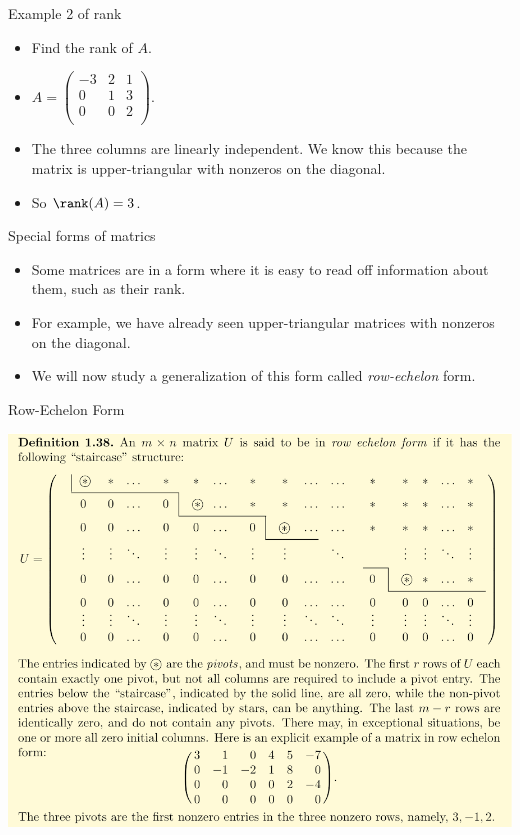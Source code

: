 \documentclass{beamer}
\begin{document}
\begin{frame}{Example 2 of rank}

\begin{itemize}
\item Find the rank of $A$.
\item $A=
\begin{pmatrix}
-3  & 2  & 1 \\
0   & 1  & 3 \\
0   & 0  & 2 \\
\end{pmatrix}
$.
\item The three columns are linearly independent. We know this because the
matrix is upper-triangular with nonzeros on the diagonal.
\item So $\rank(A) = 3$.
\end{itemize}

\end{frame}


\begin{frame}{Special forms of matrics}

\begin{itemize}
\item Some matrices are in a form where it is easy to read off information
about them, such as their rank.
\item For example, we have already seen upper-triangular matrices with
nonzeros on the diagonal.
\item We will now study a generalization of this form called \emph{row-echelon} form.
\end{itemize}


\end{frame}


\begin{frame}{Row-Echelon Form}

\begin{center}
\includegraphics[scale=0.25]{row-echelon-form}
\end{center}

\end{frame}
\end{document}
